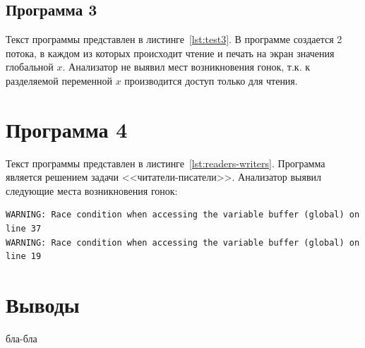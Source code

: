 

\subsection{Программа 3}

Текст программы представлен в листинге~\ref{lst:test3}. В программе создается 2 потока, в каждом из которых происходит чтение и печать на экран значения глобальной $x$. Анализатор не выявил мест возникновения гонок, т.к. к разделяемой переменной $x$ производится доступ только для чтения.



\section{Программа 4}

Текст программы представлен в листинге~\ref{lst:readers-writers}. Программа является решением задачи <<читатели-писатели>>. Анализатор выявил следующие места возникновения гонок:
\begin{verbatim}
WARNING: Race condition when accessing the variable buffer (global) on line 37
WARNING: Race condition when accessing the variable buffer (global) on line 19
\end{verbatim}


\section{Выводы}

бла-бла

